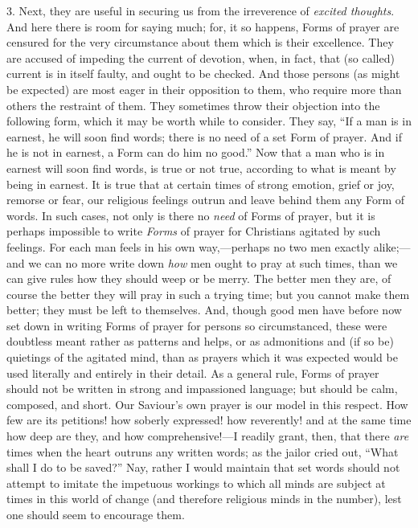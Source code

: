 3. Next, they are useful in securing us from the
irreverence of \emph{excited thoughts}. And here there is
room for saying much; for, it so happens, Forms of prayer
are censured for the very circumstance about them which
is their excellence. They are accused of impeding the
current of devotion, when, in fact, that (so called)
current is in itself faulty, and ought to be checked. And
those persons (as might be expected) are most eager in
their opposition to them, who require more than others
the restraint of them. They sometimes throw their
objection into the following form, which it may be worth
while to consider. They say, ``If a man is in
earnest, he will soon find words; there is no need of a
set Form of prayer. And if he is not in earnest, a Form
can do him no good.'' Now that a man who is in
earnest will soon find words, is true or not true,
according to what is meant by being in earnest. It is
true that at certain times of strong emotion, grief or
joy, remorse or fear, our religious feelings outrun and
leave behind them any Form of words. In such cases, not
only is there no \emph{need} of Forms of prayer, but it
is perhaps impossible to write \emph{Forms} of prayer for
Christians agitated by such feelings. For each man feels
in his own way,—perhaps no two men exactly
alike;—and we can no more write down \emph{how} men
ought to pray at such times, than we can give rules how
they should weep or be merry. The better men they are, of
course the better they will pray in such a trying time;
but you cannot make them better; they must be left to
themselves. And, though good men have before now set down
in writing Forms of prayer for persons so circumstanced,
these were doubtless meant rather as patterns and helps,
or as admonitions and (if so be) quietings of the
agitated mind, than as prayers which it was expected
would be used literally and entirely in their detail. As
a general rule, Forms of prayer should not be written in
strong and impassioned language; but should be calm,
composed, and short. Our Saviour's own prayer is our
model in this respect. How few are its petitions! how
soberly expressed! how reverently! and at the same time
how deep are they, and how comprehensive!—I readily
grant, then, that there \emph{are} times when the heart
outruns any written words; as the jailor cried out,
``What shall I do to be saved?'' Nay, rather I
would maintain that set words should not attempt to
imitate the impetuous workings to which all minds are
subject at times in this world of change (and therefore
religious minds in the number), lest one should seem to
encourage them.

